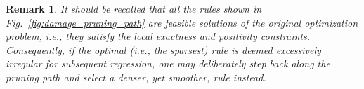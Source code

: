 \documentclass[preprint,10pt]{elsarticle}  %
\newtheorem{remark}{Remark}
\begin{document}
\begin{remark}
It should be recalled that all the rules shown in
Fig.~\ref{fig:damage_pruning_path} are feasible solutions of the
original optimization problem, i.e., they satisfy the local exactness
and positivity constraints. Consequently, if the optimal (i.e., the
sparsest) rule is deemed excessively irregular for subsequent
regression, one may deliberately step back along the pruning path and
select a denser, yet smoother, rule instead.
\end{remark}



\end{document}
